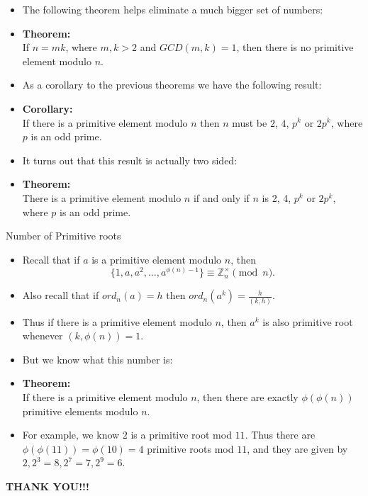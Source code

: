 \documentclass[ %
 usenames,dvipsnames,
aspectratio=169,11pt ]{beamer}
\newenvironment{stepitemize}{\begin{itemize}[<+->]}{\end{itemize} }
\newcommand{\Z}{\mathbb{Z}}
\begin{document}
\begin{frame}
    \begin{stepitemize}
    \item The following theorem helps eliminate a much bigger set of numbers:
\item {\bf Theorem:}\\
If $n=mk$, where $m,k>2$ and $GCD(m,k)=1$, then there is no primitive element modulo $n$.
\item As a corollary to the previous theorems we have the following result:
\item {\bf Corollary:}\\
If there is a primitive element modulo $n$ then $n$ must be $2$, $4$, $p^k$ or $2p^k$, where $p$ is an odd prime.
\item It turns out that this result is actually two sided:
\item {\bf Theorem:}\\
There is a primitive element modulo $n$ if and only if $n$ is 2, 4, $p^k$ or $2p^k$, where $p$ is an odd prime.
    \end{stepitemize}

\end{frame}
\begin{frame}{Number of Primitive roots}
    \begin{stepitemize}
    \item Recall that if $a$ is a primitive element modulo $n$, then
$$\{1, a, a^2, \dots, a^{\phi(n)-1}\} \equiv \Z_n^{\times} \pmod{n}.$$
\item Also recall that if $ord_n(a)=h$ then $ord_n(a^k)=\frac{h}{(k,h)}$.
\item Thus if there is a primitive element modulo $n$, then $a^k$ is also primitive root whenever $(k,\phi(n))=1$.
\item But we know what this number is:
\item {\bf Theorem:} \\
If there is a primitive element modulo $n$, then there are exactly $\phi(\phi(n))$ primitive elements modulo $n$.
\item For example, we know $2$ is a primitive root mod $11$. Thus there are $\phi(\phi(11))=\phi(10)=4$ primitive roots mod $11$, and they are given by $2, 2^3=8, 2^7=7, 2^9=6$.
    \end{stepitemize}
\end{frame}
\begin{frame}
\centerline{\color{ForestGreen}\bf{\Large THANK YOU!!!}}

\end{frame}
\end{document}
